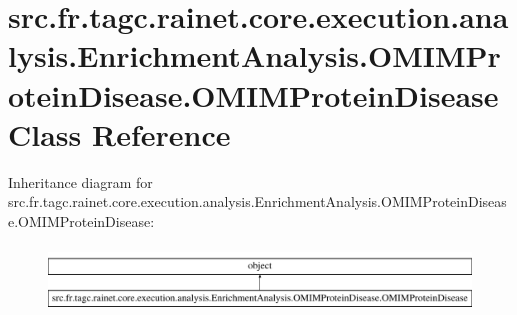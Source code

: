 \hypertarget{classsrc_1_1fr_1_1tagc_1_1rainet_1_1core_1_1execution_1_1analysis_1_1EnrichmentAnalysis_1_1OMIMP2fcd6305da6926c1482af46987449000}{\section{src.\-fr.\-tagc.\-rainet.\-core.\-execution.\-analysis.\-Enrichment\-Analysis.\-O\-M\-I\-M\-Protein\-Disease.\-O\-M\-I\-M\-Protein\-Disease Class Reference}
\label{classsrc_1_1fr_1_1tagc_1_1rainet_1_1core_1_1execution_1_1analysis_1_1EnrichmentAnalysis_1_1OMIMP2fcd6305da6926c1482af46987449000}
}
Inheritance diagram for src.\-fr.\-tagc.\-rainet.\-core.\-execution.\-analysis.\-Enrichment\-Analysis.\-O\-M\-I\-M\-Protein\-Disease.\-O\-M\-I\-M\-Protein\-Disease\-:\begin{figure}[H]
\begin{center}
\leavevmode
\includegraphics[height=1.818182cm]{classsrc_1_1fr_1_1tagc_1_1rainet_1_1core_1_1execution_1_1analysis_1_1EnrichmentAnalysis_1_1OMIMP2fcd6305da6926c1482af46987449000}
\end{center}
\end{figure}
